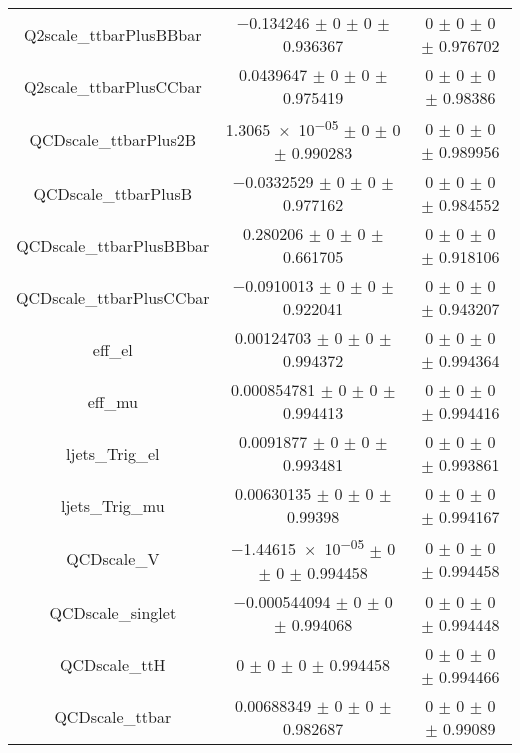 \begin{table}
\begin{tabular}{ccc}
Q2scale\_ttbarPlusBBbar & \num{-0.134246} $\pm$ \num{0} $\pm$ \num{0} $\pm$ \num{0.936367} & \num{0} $\pm$ \num{0} $\pm$ \num{0} $\pm$ \num{0.976702}\\
Q2scale\_ttbarPlusCCbar & \num{0.0439647} $\pm$ \num{0} $\pm$ \num{0} $\pm$ \num{0.975419} & \num{0} $\pm$ \num{0} $\pm$ \num{0} $\pm$ \num{0.98386}\\
QCDscale\_ttbarPlus2B & \num{1.3065e-05} $\pm$ \num{0} $\pm$ \num{0} $\pm$ \num{0.990283} & \num{0} $\pm$ \num{0} $\pm$ \num{0} $\pm$ \num{0.989956}\\
QCDscale\_ttbarPlusB & \num{-0.0332529} $\pm$ \num{0} $\pm$ \num{0} $\pm$ \num{0.977162} & \num{0} $\pm$ \num{0} $\pm$ \num{0} $\pm$ \num{0.984552}\\
QCDscale\_ttbarPlusBBbar & \num{0.280206} $\pm$ \num{0} $\pm$ \num{0} $\pm$ \num{0.661705} & \num{0} $\pm$ \num{0} $\pm$ \num{0} $\pm$ \num{0.918106}\\
QCDscale\_ttbarPlusCCbar & \num{-0.0910013} $\pm$ \num{0} $\pm$ \num{0} $\pm$ \num{0.922041} & \num{0} $\pm$ \num{0} $\pm$ \num{0} $\pm$ \num{0.943207}\\
eff\_el & \num{0.00124703} $\pm$ \num{0} $\pm$ \num{0} $\pm$ \num{0.994372} & \num{0} $\pm$ \num{0} $\pm$ \num{0} $\pm$ \num{0.994364}\\
eff\_mu & \num{0.000854781} $\pm$ \num{0} $\pm$ \num{0} $\pm$ \num{0.994413} & \num{0} $\pm$ \num{0} $\pm$ \num{0} $\pm$ \num{0.994416}\\
ljets\_Trig\_el & \num{0.0091877} $\pm$ \num{0} $\pm$ \num{0} $\pm$ \num{0.993481} & \num{0} $\pm$ \num{0} $\pm$ \num{0} $\pm$ \num{0.993861}\\
ljets\_Trig\_mu & \num{0.00630135} $\pm$ \num{0} $\pm$ \num{0} $\pm$ \num{0.99398} & \num{0} $\pm$ \num{0} $\pm$ \num{0} $\pm$ \num{0.994167}\\
QCDscale\_V & \num{-1.44615e-05} $\pm$ \num{0} $\pm$ \num{0} $\pm$ \num{0.994458} & \num{0} $\pm$ \num{0} $\pm$ \num{0} $\pm$ \num{0.994458}\\
QCDscale\_singlet & \num{-0.000544094} $\pm$ \num{0} $\pm$ \num{0} $\pm$ \num{0.994068} & \num{0} $\pm$ \num{0} $\pm$ \num{0} $\pm$ \num{0.994448}\\
QCDscale\_ttH & \num{0} $\pm$ \num{0} $\pm$ \num{0} $\pm$ \num{0.994458} & \num{0} $\pm$ \num{0} $\pm$ \num{0} $\pm$ \num{0.994466}\\
QCDscale\_ttbar & \num{0.00688349} $\pm$ \num{0} $\pm$ \num{0} $\pm$ \num{0.982687} & \num{0} $\pm$ \num{0} $\pm$ \num{0} $\pm$ \num{0.99089}\\

\end{tabular}
\end{table}
